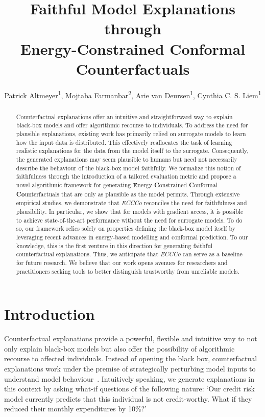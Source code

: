 \documentclass[letterpaper]{article} %
\title{Faithful Model Explanations through\\
Energy-Constrained Conformal Counterfactuals}
\author{
    Patrick Altmeyer\textsuperscript{\rm 1},
    Mojtaba Farmanbar\textsuperscript{\rm 2},
    Arie van Deursen\textsuperscript{\rm 1},
    Cynthia C. S. Liem\textsuperscript{\rm 1}
}
\begin{document}
\maketitle

\begin{abstract}
    Counterfactual explanations offer an intuitive and straightforward way to explain black-box models and offer algorithmic recourse to individuals. To address the need for plausible explanations, existing work has primarily relied on surrogate models to learn how the input data is distributed. This effectively reallocates the task of learning realistic explanations for the data from the model itself to the surrogate. Consequently, the generated explanations may seem plausible to humans but need not necessarily describe the behaviour of the black-box model faithfully. We formalize this notion of faithfulness through the introduction of a tailored evaluation metric and propose a novel algorithmic framework for generating \textbf{E}nergy-\textbf{C}onstrained \textbf{C}onformal \textbf{Co}unterfactuals that are only as plausible as the model permits. Through extensive empirical studies, we demonstrate that \textit{ECCCo} reconciles the need for faithfulness and plausibility. In particular, we show that for models with gradient access, it is possible to achieve state-of-the-art performance without the need for surrogate models. To do so, our framework relies solely on properties defining the black-box model itself by leveraging recent advances in energy-based modelling and conformal prediction. To our knowledge, this is the first venture in this direction for generating faithful counterfactual explanations. Thus, we anticipate that \textit{ECCCo} can serve as a baseline for future research. We believe that our work opens avenues for researchers and practitioners seeking tools to better distinguish trustworthy from unreliable models.
\end{abstract}

\section{Introduction}\label{intro}

Counterfactual explanations provide a powerful, flexible and intuitive way to not only explain black-box models but also offer the possibility of algorithmic recourse to affected individuals. Instead of opening the black box, counterfactual explanations work under the premise of strategically perturbing model inputs to understand model behaviour~\citep{wachter2017counterfactual}. Intuitively speaking, we generate explanations in this context by asking what-if questions of the following nature: `Our credit risk model currently predicts that this individual is not credit-worthy. What if they reduced their monthly expenditures by 10\%?'
\end{document}

